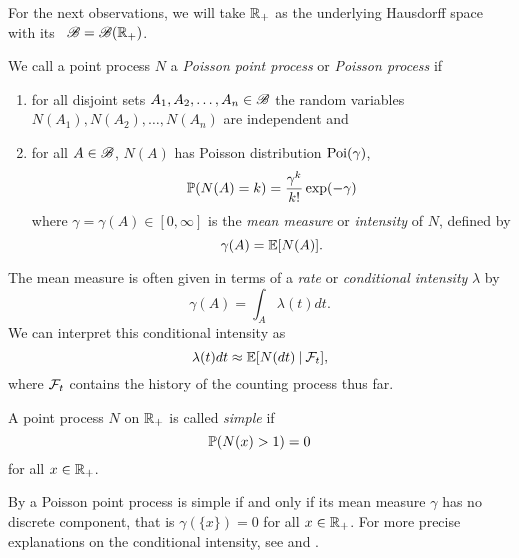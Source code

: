 \bigskip

For the next observations, we will take $\mathbb{R}_+$ as the underlying Hausdorff space with its \Bosi~$\mathscr{B} = \mathscr{B}(\mathbb{R}_+)$.

\begin{definition} \label{D: poisson process}
	We call a point process $N$ a \emph{Poisson point process} or \emph{Poisson process}
	if
	\begin{enumerate}
		\item for all disjoint sets $A_1, A_2, \dots, A_n \in \mathscr{B}$
			the random variables $N(A_1), N(A_2), \dots, N(A_n)$ are independent and
		\item for all $A \in \mathscr{B}$, $N(A)$ has Poisson distribution $\operatorname*{Poi}(\gamma)$,
			\begin{equation*}
				\mathbb{P}(N(A) = k) = \frac{\gamma^k}{k!}\exp(-\gamma)
			\end{equation*}
			where $\gamma = \gamma(A) \in [0, \infty]$ is the \emph{mean measure} or \emph{intensity} of $N$,
			defined by
			\begin{equation}
				\gamma(A) = \mathbb{E}[ N(A) ].
			\end{equation}
	\end{enumerate}
	The mean measure is often given in terms of a \emph{rate} or \emph{conditional intensity} $\lambda$ by
	\begin{equation} \label{D: def gamma(A)}
		\gamma(A) = \int_A \lambda(t)dt.
	\end{equation}
	We can interpret this conditional intensity as
	\begin{equation}
		\lambda(t)dt \approx \mathbb{E}[ N(dt) \: | \: \mathcal{F}_{t} ] ,
	\end{equation}
	where $\mathcal{F}_{t}$ contains the history of the counting process thus far.
\end{definition}

\begin{definition} \label{D: simple point process}
	A point process $N$ on $\mathbb{R}_+$ is called \emph{simple} if 
	\begin{equation}
		\mathbb{P}( N({x}) > 1 ) = 0
	\end{equation}
	for all $x \in \mathbb{R}_+$.
\end{definition}

By \cite[Remark 2.1, p.34]{Haenggi.2013} a Poisson point process is simple if and only if
its mean measure $\gamma$ has no discrete component,
that is $\gamma(\{x\}) = 0$ for all $x \in \mathbb{R}_+$.
For more precise explanations on the conditional intensity, see \cite[p.231ff.]{Daley.2003} and \cite[Chapter 14]{Daley.2008}.

